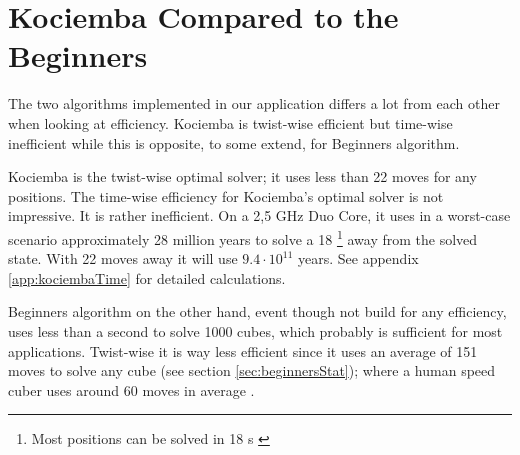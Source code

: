 \section{Kociemba Compared to the Beginners}
The two algorithms implemented in our application differs a lot from each other when looking at efficiency. 
Kociemba is twist-wise efficient but time-wise inefficient while this is opposite, to some extend, for Beginners algorithm. 

Kociemba is the twist-wise optimal solver; it uses less than 22 moves for any positions. 
The time-wise efficiency for Kociemba's optimal solver is not impressive. It is rather inefficient. On a 2,5 GHz Duo Core, it uses in a worst-case scenario approximately 28 million years to solve a \cube{} 18 \twist{}\footnote{Most positions can be solved in 18 \twist{}s \cite{kociemba09}} away from the solved state. With 22 moves away it will use $9.4\cdot{}10^{11}$ years. See appendix \ref{app:kociembaTime} for detailed calculations.   

Beginners algorithm on the other hand, event though not build for any efficiency, uses less than a second to solve 1000 cubes, which probably is sufficient for most applications. 
Twist-wise it is way less efficient since it uses an average of 151 moves to solve any cube (see section \ref{sec:beginnersStat}); where a human speed cuber uses around 60 moves in average \cite{larsPetrus97} \cite{cubeFreak}.
